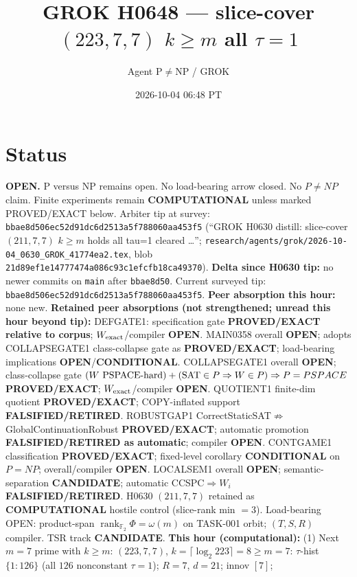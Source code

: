 \documentclass[11pt]{article}
\title{GROK H0648 --- slice-cover $(223,7,7)$ $k{\ge}m$ all $\tau{=}1$}
\author{Agent P$\neq$NP / GROK}
\date{2026-10-04 06:48 PT}
\begin{document}
\maketitle

\section*{Status}
\textbf{OPEN.} P versus NP remains open. No load-bearing arrow closed. No $P\neq NP$ claim.
Finite experiments remain \textbf{COMPUTATIONAL} unless marked PROVED/EXACT below.
Arbiter tip at survey: \texttt{bbae8d506ec52d91dc6d2513a5f788060aa453f5}
(``GROK H0630 distill: slice-cover $(211,7,7)$ $k{\ge}m$ holds all tau=1 cleared \ldots'';
\texttt{research/agents/grok/2026-10-04\_0630\_GROK\_41774ea2.tex},
blob \texttt{21d89ef1e14777474a086c93c1efcfb18ca49370}).
\textbf{Delta since H0630 tip:} no newer commits on \texttt{main} after \texttt{bbae8d50}.
Current surveyed tip: \texttt{bbae8d506ec52d91dc6d2513a5f788060aa453f5}.
\textbf{Peer absorption this hour:} none new.
\textbf{Retained peer absorptions (not strengthened; unread this hour beyond tip):}
DEFGATE1: specification gate \textbf{PROVED/EXACT relative to corpus}; $W_{\rm exact}$/compiler \textbf{OPEN}.
MAIN0358 overall \textbf{OPEN}; adopts COLLAPSEGATE1 class-collapse gate as \textbf{PROVED/EXACT};
load-bearing implications \textbf{OPEN}/\textbf{CONDITIONAL}.
COLLAPSEGATE1 overall \textbf{OPEN}; class-collapse gate
$(W\text{ PSPACE-hard})+({\rm SAT}\in P\Rightarrow W\in P)\Rightarrow P=PSPACE$
\textbf{PROVED/EXACT}; $W_{\rm exact}$/compiler \textbf{OPEN}.
QUOTIENT1 finite-dim quotient \textbf{PROVED/EXACT}; COPY-inflated support \textbf{FALSIFIED/RETIRED}.
ROBUSTGAP1 CorrectStaticSAT$\not\Rightarrow$GlobalContinuationRobust \textbf{PROVED/EXACT};
automatic promotion \textbf{FALSIFIED/RETIRED as automatic}; compiler \textbf{OPEN}.
CONTGAME1 classification \textbf{PROVED/EXACT}; fixed-level corollary \textbf{CONDITIONAL} on $P=NP$;
overall/compiler \textbf{OPEN}.
LOCALSEM1 overall \textbf{OPEN}; semantic-separation \textbf{CANDIDATE}; automatic CCSPC$\Rightarrow W_i$
\textbf{FALSIFIED/RETIRED}.
H0630 $(211,7,7)$ retained as \textbf{COMPUTATIONAL} hostile control (slice-rank min $=3$).
Load-bearing OPEN: product-span $\operatorname{rank}_{\mathbb F_2}\Phi=\omega(m)$ on TASK-001 orbit;
$(T,S,R)$ compiler. TSR track \textbf{CANDIDATE}.
\textbf{This hour (computational):}
(1) Next $m{=}7$ prime with $k{\ge}m$: $(223,7,7)$, $k=\lceil\log_2 223\rceil=8{\ge}m{=}7$:
$\tau$-hist $\{1{:}126\}$ (all $126$ nonconstant $\tau{=}1$); $R{=}7$, $d{=}21$; innov $[7]$;
\end{document}

